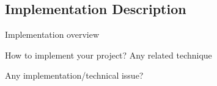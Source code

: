 \subsection{Implementation Description}


Implementation overview

How to implement your project?
  Any related technique

Any implementation/technical issue?
